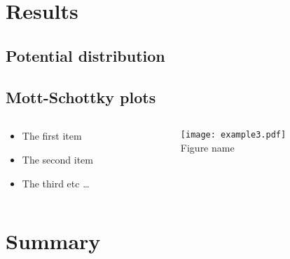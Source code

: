 \documentclass[final]{beamer}
\begin{document}
\begin{poster}
\newcolumn

\section{Results} \justifying
\subsection{Potential distribution}

\subsection{Mott-Schottky plots}

\begin{columns}[c]
    \begin{column}{0.4\columnwidth}
            \begin{itemize}    \itemsep-12pt          
                \item The first item
                \item The second item
                \item The third etc \ldots
            \end{itemize}
    \end{column}
    
    \begin{column}{0.6\columnwidth}
       \centering
       \texttt{[image: example3.pdf]}
       \\ \caption{Figure name}  
    \end{column}
   \end{columns}	


\section{Summary} \justifying

\end{poster}
\end{document}
